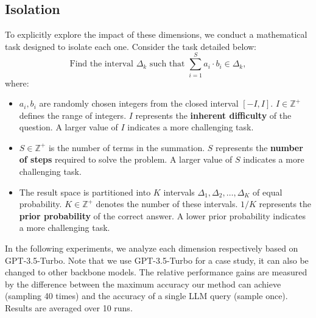 \subsection{Isolation}

To explicitly explore the impact of these dimensions, we conduct a mathematical task designed to isolate each one. Consider the task detailed below:
\begin{equation}
    \text{Find the interval } \Delta_k \text{ such that } \sum_{i=1}^{S} a_i \cdot b_i \in \Delta_k,
\end{equation}
where:
\begin{itemize}
    \item \(a_i, b_i\) are randomly chosen integers from the closed interval \([-I, I]\). \(I \in \mathbb{Z}^+\) defines the range of integers. $I$ represents the \textbf{inherent difficulty} of the question. A larger value of $I$ indicates a more challenging task.
    \item \(S \in \mathbb{Z}^+\) is the number of terms in the summation. $S$ represents the \textbf{number of steps} required to solve the problem. A larger value of $S$ indicates a more challenging task.
    \item The result space is partitioned into \(K\) intervals \(\Delta_1, \Delta_2, \ldots, \Delta_K\) of equal probability. \(K \in \mathbb{Z}^+\) denotes the number of these intervals. $1/K$ represents the \textbf{prior probability} of the correct answer. A lower prior probability indicates a more challenging task.
\end{itemize}
In the following experiments, we analyze each dimension respectively based on GPT-3.5-Turbo. 
Note that we use GPT-3.5-Turbo for a case study, it can also be changed to other backbone models. 
The relative performance gains are measured by the difference between the maximum accuracy our method can achieve (sampling 40 times) and the accuracy of a single LLM query (sample once). Results are averaged over 10 runs.

